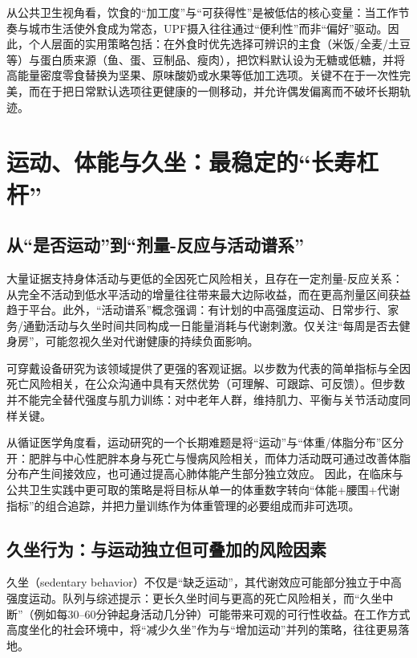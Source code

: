 \documentclass[11pt,a4paper]{article}
\begin{document}
从公共卫生视角看，饮食的“加工度”与“可获得性”是被低估的核心变量：当工作节奏与城市生活使外食成为常态，UPF摄入往往通过“便利性”而非“偏好”驱动。因此，个人层面的实用策略包括：在外食时优先选择可辨识的主食（米饭/全麦/土豆等）与蛋白质来源（鱼、蛋、豆制品、瘦肉），把饮料默认设为无糖或低糖，并将高能量密度零食替换为坚果、原味酸奶或水果等低加工选项。关键不在于一次性完美，而在于把日常默认选项往更健康的一侧移动，并允许偶发偏离而不破坏长期轨迹。

\section{运动、体能与久坐：最稳定的“长寿杠杆”}

\subsection{从“是否运动”到“剂量-反应与活动谱系”}

大量证据支持身体活动与更低的全因死亡风险相关，且存在一定剂量-反应关系：从完全不活动到低水平活动的增量往往带来最大边际收益，而在更高剂量区间获益趋于平台\cite{mortalityreductionwith2019,longtermleisure2022,doseresponserelationship2024}。此外，“活动谱系”概念强调：有计划的中高强度运动、日常步行、家务/通勤活动与久坐时间共同构成一日能量消耗与代谢刺激。仅关注“每周是否去健身房”，可能忽视久坐对代谢健康的持续负面影响。\cite{acompositionalanalysis2021,sedentarytimeand2022}

可穿戴设备研究为该领域提供了更强的客观证据。以步数为代表的简单指标与全因死亡风险相关，在公众沟通中具有天然优势（可理解、可跟踪、可反馈）\cite{dailystepsand2022,associationofdaily2020}。但步数并不能完全替代强度与肌力训练：对中老年人群，维持肌力、平衡与关节活动度同样关键。

从循证医学角度看，运动研究的一个长期难题是将“运动”与“体重/体脂分布”区分开：肥胖与中心性肥胖本身与死亡与慢病风险相关，而体力活动既可通过改善体脂分布产生间接效应，也可通过提高心肺体能产生部分独立效应。\cite{epidemiologyofobesity2016,obesitycentraladiposity2018} 因此，在临床与公共卫生实践中更可取的策略是将目标从单一的体重数字转向“体能+腰围+代谢指标”的组合追踪，并把力量训练作为体重管理的必要组成而非可选项。\cite{summaryofthe2015,physicalactivityin2016}

\subsection{久坐行为：与运动独立但可叠加的风险因素}

久坐（sedentary behavior）不仅是“缺乏运动”，其代谢效应可能部分独立于中高强度运动。队列与综述提示：更长久坐时间与更高的死亡风险相关，而“久坐中断”（例如每30--60分钟起身活动几分钟）可能带来可观的可行性收益\cite{sedentarybehaviourand2018,sedentarytimeand2022}。在工作方式高度坐化的社会环境中，将“减少久坐”作为与“增加运动”并列的策略，往往更易落地。
\end{document}

